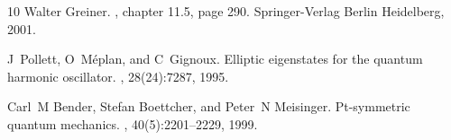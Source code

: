 \documentclass[a4paper, 12pt]{article}
\begin{document}
\begin{thebibliography}{10}
  Walter Greiner.
  , chapter 11.5, page 290.
  \newblock Springer-Verlag Berlin Heidelberg, 2001.
  
  J~Pollett, O~M{\'e}plan, and C~Gignoux.
  \newblock Elliptic eigenstates for the quantum harmonic oscillator.
  , 28(24):7287,
    1995.
  
    
  Carl~M Bender, Stefan Boettcher, and Peter~N Meisinger.
  \newblock Pt-symmetric quantum mechanics.
  , 40(5):2201--2229, 1999.
  
  \end{thebibliography}
     
\end{document}
